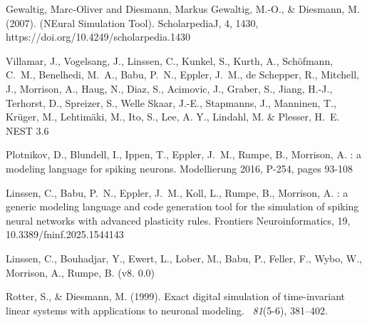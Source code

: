 \documentclass[10pt,a4paper,twoside,american]{article}
\begin{document}
\begin{thebibliography}{}

{Gewaltig, Marc-Oliver and Diesmann, Markus}
Gewaltig, M.-O., \& Diesmann, M. (2007).
 ({NE}ural {S}imulation {T}ool).
\newblock ScholarpediaJ, 4, 1430, https://doi.org/10.4249/scholarpedia.1430

Villamar, J., Vogelsang, J., Linssen, C., Kunkel, S., Kurth, A., Sch\"{o}fmann, C.~M., Benelhedi, M.~A., Babu, P.~N., Eppler, J.~M., de Schepper, R., Mitchell, J., Morrison, A., Haug, N., Diaz, S., Acimovic, J., Graber, S., Jiang, H.-J., Terhorst, D., Spreizer, S., Welle Skaar, J.-E., Stapmanns, J., Manninen, T., Krüger, M., Lehtimäki, M., Ito, S., Lee, A. Y., Lindahl, M. \& Plesser, H.~E.
\newblock NEST 3.6

Plotnikov, D., Blundell, I., Ippen, T., Eppler, J.~M., Rumpe, B., Morrison, A.
: a modeling language for spiking neurons.
\newblock Modellierung 2016, P-254, pages 93-108

Linssen, C., Babu, P.~N., Eppler, J.~M., Koll, L., Rumpe, B., Morrison, A.
: a generic modeling language and code generation tool for the simulation of spiking neural networks with advanced plasticity rules.
\newblock Frontiers Neuroinformatics, 19, 10.3389/fninf.2025.1544143

Linssen, C., Bouhadjar, Y., Ewert, L., Lober, M.,  Babu, P., Feller, F., Wybo, W., Morrison, A., Rumpe, B.
 (v8. 0.0)

Rotter, S., \& Diesmann, M. (1999).
\newblock Exact digital simulation of time-invariant linear systems with
  applications to neuronal modeling.
~{\em 81\/}(5-6), 381--402.

\end{thebibliography}
\end{document}
